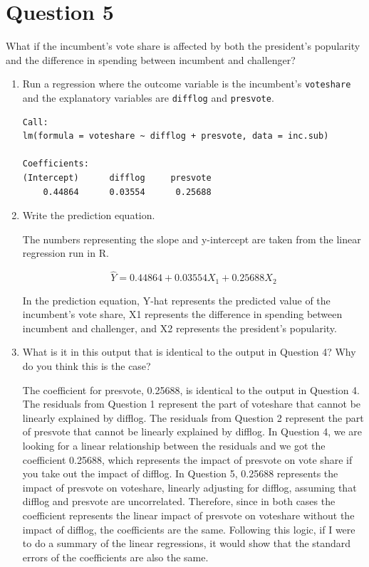 \documentclass[12pt,letterpaper]{article}
\begin{document}
\section*{Question 5}
\noindent What if the incumbent's vote share is affected by both the president's popularity and the difference in spending between incumbent and challenger? 
	\begin{enumerate}
		\item Run a regression where the outcome variable is the incumbent's \texttt{voteshare} and the explanatory variables are \texttt{difflog} and \texttt{presvote}.
		
		\begin{verbatim}
Call:
lm(formula = voteshare ~ difflog + presvote, data = inc.sub)

Coefficients:
(Intercept)      difflog     presvote  
    0.44864      0.03554      0.25688 
		\end{verbatim}
		\item Write the prediction equation.
		
		\noindent The numbers representing the slope and y-intercept are taken from the linear regression run in R.
		
		\noindent $$\hat{Y} = 0.44864 + 0.03554X_{1} + 0.25688X_{2} $$
	
    	\noindent In the prediction equation, Y-hat represents the predicted value of the incumbent's vote share, X1 represents the difference in spending between incumbent and challenger, and X2 represents the president's popularity.
	
		\vspace{.25cm}
		\item What is it in this output that is identical to the output in Question 4? Why do you think this is the case?
	
		\vspace{.25cm}
	
		\noindent The coefficient for presvote, 0.25688, is identical to the output in Question 4. The residuals from Question 1 represent the part of voteshare that cannot be linearly explained by difflog. The residuals from Question 2 represent the part of presvote that cannot be linearly explained by difflog. In Question 4, we are looking for a linear relationship between the residuals and we got the coefficient 0.25688, which represents the impact of presvote on vote share if you take out the impact of difflog. In Question 5, 0.25688 represents the impact of presvote on voteshare, linearly adjusting for difflog, assuming that difflog and presvote are uncorrelated. Therefore, since in both cases the coefficient represents the linear impact of presvote on voteshare without the impact of difflog, the coefficients are the same. Following this logic, if I were to do a summary of the linear regressions, it would show that the standard errors of the coefficients are also the same.
		
		
		
	\end{enumerate}
\end{document}
